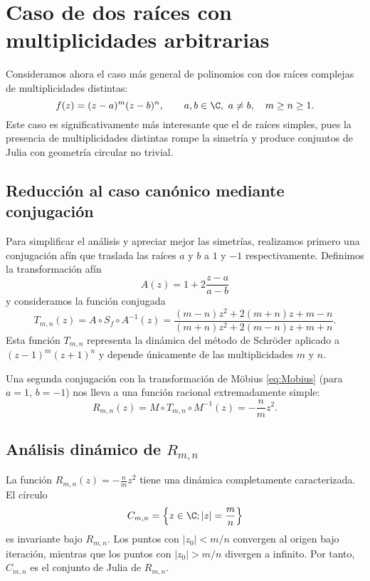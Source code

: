 \section{Caso de dos raíces con multiplicidades arbitrarias}

Consideramos ahora el caso más general de polinomios con dos raíces complejas de multiplicidades distintas:
\begin{equation}
 f(z)=(z-a)^m(z-b)^n,\qquad a,b\in\C,\ a\ne b,\quad m\ge n\ge 1.
 \label{eq:poly_dos_raices}
\end{equation}
Este caso es significativamente más interesante que el de raíces simples, pues la presencia de multiplicidades distintas rompe la simetría y produce conjuntos de Julia con geometría circular no trivial.

\subsection{Reducción al caso canónico mediante conjugación}

Para simplificar el análisis y apreciar mejor las simetrías, realizamos primero una conjugación afín que traslada las raíces $a$ y $b$ a $1$ y $-1$ respectivamente. Definimos la transformación afín
\begin{equation}
A(z)=1+2\frac{z-a}{a-b}
\label{eq:afin}
\end{equation}
y consideramos la función conjugada
\begin{equation}
T_{m,n}(z)=A\circ S_f\circ A^{-1}(z)=\frac{(m-n) z^2 +2 (m+n) z +m-n}{(m+n) z^2 +2(m-n)z +m+n}.
\label{eq:Tmn}
\end{equation}
Esta función $T_{m,n}$ representa la dinámica del método de Schröder aplicado a $(z-1)^m(z+1)^n$ y depende únicamente de las multiplicidades $m$ y $n$.

Una segunda conjugación con la transformación de Möbius \eqref{eq:Mobius} (para $a=1$, $b=-1$) nos lleva a una función racional extremadamente simple:
\begin{equation}
R_{m,n}(z)=M\circ T_{m,n}\circ M^{-1}(z)=-\frac{n}{m}z^2.
\label{eq:Rmn}
\end{equation}

\subsection{Análisis dinámico de $R_{m,n}$}

La función $R_{m,n}(z)=-\tfrac{n}{m}z^2$ tiene una dinámica completamente caracterizada. El círculo
$$
C_{m,n}=\left\{z\in\C; |z|=\frac{m}{n}\right\}
$$
es invariante bajo $R_{m,n}$. Los puntos con $|z_0|<m/n$ convergen al origen bajo iteración, mientras que los puntos con $|z_0|>m/n$ divergen a infinito. Por tanto, $C_{m,n}$ es el conjunto de Julia de $R_{m,n}$.

